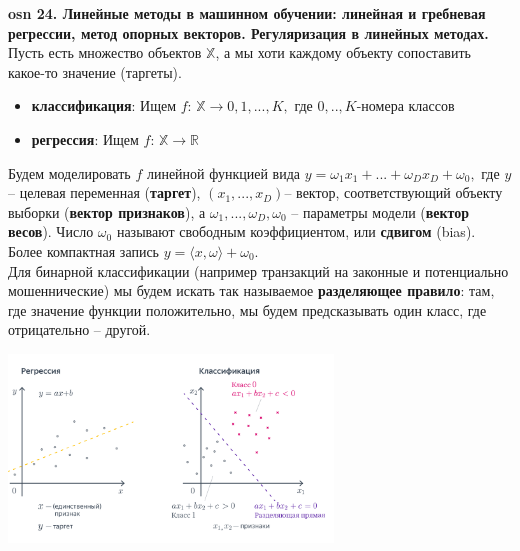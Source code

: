 

\textbf{\LARGE osn 24. Линейные методы в машинном обучении: линейная и гребневая регрессии, метод опорных векторов. Регуляризация в линейных методах. }  \\

Пусть есть множество объектов $\mathbb{X}$, а мы хоти каждому объекту сопоставить какое-то значение (таргеты).

\begin{itemize}
    \item \textbf{классификация}: Ищем $f$: $\mathbb{X} \xrightarrow{}0,1,...,K,$ где $0,..,K$-номера классов
    \item \textbf{регрессия}:  Ищем $f$: $\mathbb{X} \xrightarrow{} \mathbb{R}$
\end{itemize}
Будем моделировать $f$ линейной функцией вида $ y = \omega_1x_1+...+\omega_Dx_D+\omega_0,$ где $y$ – целевая переменная (\textbf{таргет}), $(x_1,...,x_D)$– вектор, соответствующий объекту выборки (\textbf{вектор признаков}), а $\omega_1,...,\omega_D,\omega_0$ – параметры модели (\textbf{вектор весов}). Число $\omega_0$ называют свободным коэффициентом, или \textbf{сдвигом} (bias). Более компактная запись $y = \langle{x, \omega}\rangle+\omega_0$. \\

Для бинарной классификации (например транзакций на законные и потенциально мошеннические) мы будем искать так называемое \textbf{разделяющее правило}: там, где значение функции положительно, мы будем предсказывать один класс, где отрицательно – другой.
\begin{center}
    \includegraphics[height=5cm]{pics/t_osn24_linear_models.png}
\end{center}


